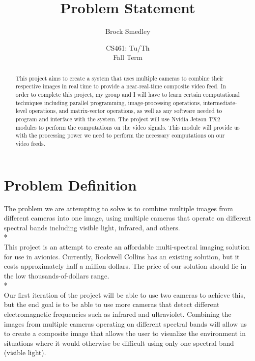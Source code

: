 \documentclass[10pt,letterpaper,draftclsnofoot,onecolumn]{report}
\author{Brock Smedley}
\title{Problem Statement}
\date{CS461: Tu/Th\\
Fall Term}
\begin{document}
\maketitle


\begin{abstract}

This project aims to create a system that uses multiple cameras to combine their respective images in real time to provide a near-real-time composite video feed. In order to complete this project, my group and I will have to learn certain computational techniques including parallel programming, image-processing operations, intermediate-level operations, and matrix-vector operations, as well as any software needed to program and interface with the system.
The project will use Nvidia Jetson TX2 modules to perform the computations on the video signals. This module will provide us with the processing power we need to perform the necessary computations on our video feeds.
\end{abstract}

\section*{Problem Definition}
The problem we are attempting to solve is to combine multiple images from different cameras into one image, using multiple cameras that operate on different spectral bands including visible light, infrared, and others.
\\*\\
This project is an attempt to create an affordable multi-spectral imaging solution for use in avionics. Currently, Rockwell Collins has an existing solution, but it costs approximately half a million dollars. The price of our solution should lie in the low thousands-of-dollars range.
\\*\\
Our first iteration of the project will be able to use two cameras to achieve this, but the end goal is to be able to use more cameras that detect different electromagnetic frequencies such as infrared and ultraviolet. Combining the images from multiple cameras operating on different spectral bands will allow us to create a composite image that allows the user to visualize the environment in situations where it would otherwise be difficult using only one spectral band (visible light).
\end{document}
